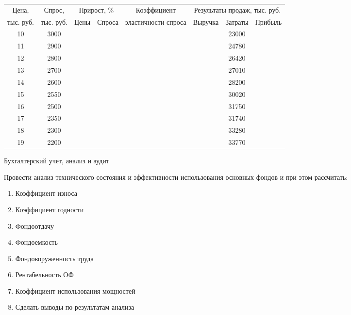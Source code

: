 \documentclass[
	11pt,
	a4paper,
	]
	{article}
\begin{document}
\begin{table}[ht!]\centering
\begin{tabular}{|c |c |cc |c |c|c|c|}
\hline
Цена, &
Спрос, &
\multicolumn{2}{c|}{Прирост, \%} &
Коэффициент &
\multicolumn{3}{c|}{Результаты продаж, тыс. руб.}
\\ \cline{3-4} \cline{6-8}
тыс. руб. &
тыс. руб. &
Цены &
Спроса &
эластичности спроса &
Выручка &
Затраты &
Прибыль
\\ \hline
10 & 3000 & & & & & 23000 & \\ \hline
11 & 2900 & & & & & 24780 & \\ \hline
12 & 2800 & & & & & 26420 & \\ \hline
13 & 2700 & & & & & 27010 & \\ \hline
14 & 2600 & & & & & 28200 & \\ \hline
15 & 2550 & & & & & 30020 & \\ \hline
16 & 2500 & & & & & 31750 & \\ \hline
17 & 2350 & & & & & 31740 & \\ \hline
18 & 2300 & & & & & 33280 & \\ \hline
19 & 2200 & & & & & 33770 & \\ \hline
\end{tabular}
\end{table}

\begin{center}\lowGE * \end{center}
\newpage



 {Бухгалтерский учет, анализ и аудит}
\prGE

	Провести анализ технического состояния и эффективности использования основных фондов и при этом рассчитать: 

\begin{enumerate}
	\item Коэффициент износа
	\item Коэффициент годности
	\item Фондоотдачу
	\item Фондоемкость
	\item Фондоворуженность труда
	\item Рентабельность ОФ
	\item Коэффициент использования мощностей
	\item Сделать выводы по результатам анализа
\end{enumerate}
\end{document}
